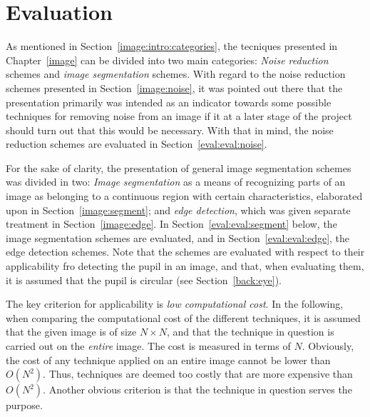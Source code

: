 
\section{Evaluation}
\label{eval:eval}

As mentioned in Section~\ref{image:intro:categories}, the tecniques
presented in Chapter~\ref{image} can be divided into two main
categories: {\em Noise reduction\/} schemes and {\em image
  segmentation\/} schemes.  With regard to the noise reduction schemes
presented in Section~\ref{image:noise}, it was pointed out there that
the presentation primarily was intended as an indicator towards some
possible techniques for removing noise from an image if it at a later
stage of the project should turn out that this would be necessary.
With that in mind, the noise reduction schemes are evaluated in
Section~\ref{eval:eval:noise}.

For the sake of clarity, the presentation of general image
segmentation schemes was divided in two: {\em Image segmentation\/} as
a means of recognizing parts of an image as belonging to a continuous
region with certain characteristics, elaborated upon in
Section~\ref{image:segment}; and {\em edge detection\/}, which was
given separate treatment in Section~\ref{image:edge}.  In
Section~\ref{eval:eval:segment} below, the image segmentation schemes
are evaluated, and in Section~\ref{eval:eval:edge}, the edge detection
schemes.  Note that the schemes are evaluated with respect to their
applicability fro detecting the pupil in an image, and that, when
evaluating them, it is assumed that the pupil is circular (see
Section~\ref{back:eye}).

The key criterion for applicability is {\em low computational cost\/}.
In the following, when comparing the computational cost of the
different techniques, it is assumed that the given image is of size
$N\times N$, and that the technique in question is carried out on the
{\em entire\/} image.  The cost is measured in terms of $N$.
Obviously, the cost of any technique applied on an entire image cannot
be lower than $O(N^{2})$.  Thus, techniques are deemed too costly that
are more expensive than $O(N^{2})$.  Another obvious criterion is that
the technique in question serves the purpose.

